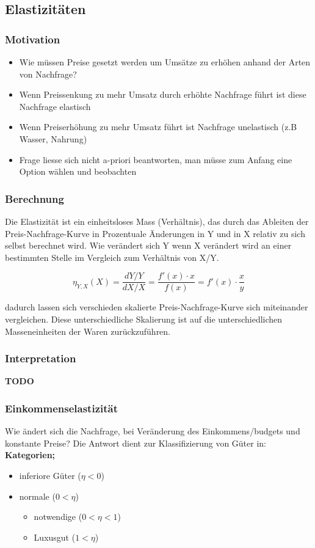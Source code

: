 \subsection{Elastizitäten}

\subsubsection{Motivation}
\begin{itemize}
    \item Wie müssen Preise gesetzt werden um Umsätze zu erhöhen anhand der Arten von Nachfrage?
    \item Wenn Preissenkung zu mehr Umsatz durch erhöhte Nachfrage führt ist diese Nachfrage elastisch
    \item Wenn Preiserhöhung zu mehr Umsatz führt ist Nachfrage unelastisch (z.B Wasser, Nahrung)
    \item Frage liesse sich nicht a-priori beantworten, man müsse zum Anfang eine Option wählen und beobachten
\end{itemize}

\subsubsection{Berechnung}

Die Elastizität ist ein einheitsloses Mass (Verhältnis), das durch das Ableiten der Preis-Nachfrage-Kurve in Prozentuale Änderungen in Y und in X relativ zu sich selbst berechnet wird. Wie verändert sich Y wenn X verändert wird an einer bestimmten Stelle im Vergleich zum Verhältnis von X/Y.

\begin{equation}
    \eta_{Y,X}(X) = \frac{dY / Y}{dX / X} = \frac{f'(x)\cdot x}{f(x)} = f'(x) \cdot \frac{x}{y}
\end{equation}

dadurch lassen sich verschieden skalierte Preis-Nachfrage-Kurve sich miteinander vergleichen. Diese unterschiedliche Skalierung ist auf die unterschiedlichen Masseneinheiten der Waren zurückzuführen.
\subsubsection{Interpretation}
\textbf{TODO}
\subsubsection{Einkommenselastizität}
Wie ändert sich die Nachfrage, bei Veränderung des Einkommens/budgets und konstante Preise? Die Antwort dient zur Klassifizierung von Güter in:
\textbf{Kategorien;}
\begin{itemize}
    \item inferiore Güter ($ \eta < 0$)
    \item normale ($ 0 < \eta$)
    \begin{itemize}
        \item notwendige ($0 < \eta < 1$)
        \item Luxusgut ($ 1 < \eta $)
    \end{itemize}
\end{itemize}

